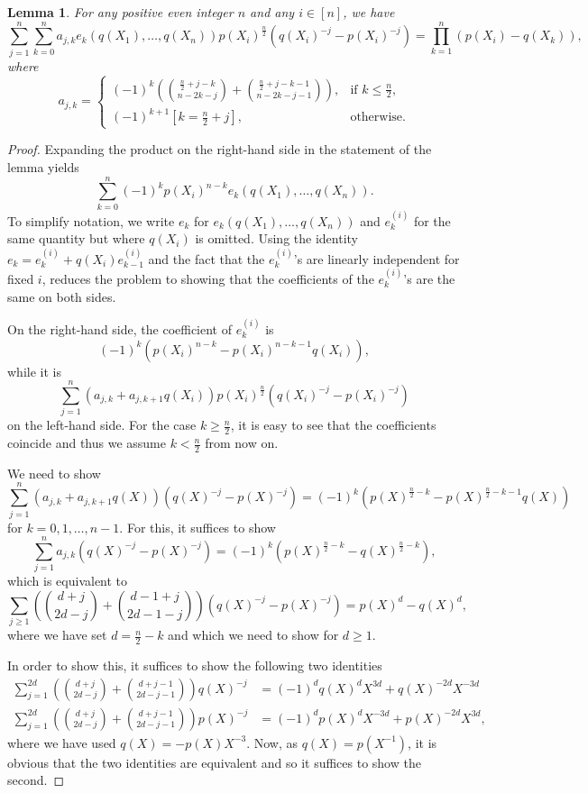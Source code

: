 \documentclass[12pt,dvipsnames]{amsart}
\newtheorem{lemma}[theorem]{Lemma}
\theoremstyle{definition}
\begin{document}
\begin{lemma}
\label{coeffbase}
For any positive even integer $n$ and any $i \in [n]$, we have 
$$
\sum_{j=1}^n \sum_{k=0}^n a_{j,k} e_k(q(X_1),\ldots,q(X_n))p(X_i)^{\frac{n}{2}}(q(X_i)^{-j}-p(X_i)^{-j}) = 
\prod_{k=1}^n (p(X_i) - q(X_k)),
$$ 
where 
$$
a_{j,k} = 
\begin{cases} (-1)^k \left( \binom{\frac{n}{2}+j-k}{n-2k-j} + \binom{\frac{n}{2}+j-k-1}{n-2k-j-1}\right), & \text{if 
$k \le \frac{n}{2}$}, \\
                       (-1)^{k+1} \left[k=\frac{n}{2}+j\right], & \text{otherwise}.
\end{cases} 
$$    
\end{lemma} 



\begin{proof} 
Expanding the product on the right-hand side in the statement of the lemma yields
$$
\sum_{k=0}^n (-1)^k p(X_i)^{n-k} e_k(q(X_1),\ldots,q(X_n)).
$$
To simplify notation, we write $e_k$ for $e_k(q(X_1),\ldots,q(X_n))$ and $e^{(i)}_k$ for the same quantity but where $q(X_i)$ is 
omitted. Using the identity $e_k=e_k^{(i)}+q(X_i) e_{k-1}^{(i)}$ 
and the fact that the $e^{(i)}_k$'s are linearly independent for fixed $i$, reduces the problem to showing that 
the coefficients of the $e^{(i)}_k$'s are the same on both sides. 

On the right-hand side, the coefficient of $e_{k}^{(i)}$ is 
$$
(-1)^{k} \left(p(X_i)^{n-k}-p(X_i)^{n-k-1} q(X_i) \right),
$$
while it is 
$$
\sum_{j=1}^n (a_{j,k}+a_{j,k+1}q(X_i)) p(X_i)^{\frac{n}{2}}(q(X_i)^{-j}-p(X_i)^{-j}) 
$$
on the left-hand side. For the case $k \ge \frac{n}{2}$, it is easy to see that the coefficients 
coincide and thus we assume 
$k < \frac{n}{2}$ from now on.

We need to show 
$$
\sum_{j=1}^n (a_{j,k}+ a_{j,k+1} q(X)) (q(X)^{-j}-p(X)^{-j}) =
(-1)^k (p(X)^{\frac{n}{2}-k}-p(X)^{\frac{n}{2}-k-1} q(X))
$$
for $k=0,1,\ldots,n-1$. 
For this, it suffices to show 
$$
\sum_{j=1}^n a_{j,k} \left(q(X)^{-j}-p(X)^{-j} \right) = (-1)^k \left( p(X)^{\frac{n}{2}-k} - q(X)^{\frac{n}{2}-k} \right),
$$
which is equivalent to 
$$
\sum_{j \ge 1} \left( \binom{d+j}{2d-j} + \binom{d-1+j}{2d-1-j}\right) \left(q(X)^{-j}-p(X)^{-j} \right) = p(X)^{d} - q(X)^{d},
$$
where we have set $d=\frac{n}{2}-k$ and which we need to show for $d \ge 1$. 

In order to show this, it suffices to show the following two identities 
\begin{align*} 
\sum_{j=1}^{2d} \left( \binom{d+j}{2d-j} + \binom{d+j-1}{2d-j-1} \right) q(X)^{-j} &= (-1)^d q(X)^d X^{3d} + q(X)^{-2d} X^{-3d} \\
\sum_{j=1}^{2d} \left( \binom{d+j}{2d-j} + \binom{d+j-1}{2d-j-1} \right) p(X)^{-j} &= (-1)^d p(X)^d X^{-3d}+ p(X)^{-2d} X^{3d},
\end{align*}
where we have used $q(X)=-p(X) X^{-3}$.
Now, as $q(X)=p(X^{-1})$, it is obvious that the two identities are equivalent and so it suffices to show the second. 



\end{proof}
\end{document}
